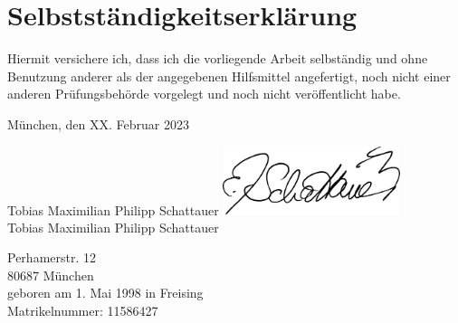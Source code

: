 \chapter*{Selbstständigkeitserklärung}
Hiermit versichere ich, dass ich die vorliegende Arbeit selbständig und ohne Benutzung anderer als der angegebenen Hilfsmittel angefertigt, noch nicht einer anderen Prüfungsbehörde vorgelegt und noch nicht veröffentlicht habe.

\vspace{5cm}
München, den XX. Februar 2023

\ifprintversion
    \vspace{3cm}
    Tobias Maximilian Philipp Schattauer
\else
    \vspace{1cm}
    \includegraphics[height=2cm]{img/full_a4.png}\\
    Tobias Maximilian Philipp Schattauer
\fi

\ifprintversion
Perhamerstr. 12 \\
80687 München \\
geboren am 1. Mai 1998 in Freising \\
Matrikelnummer: 11586427
\fi